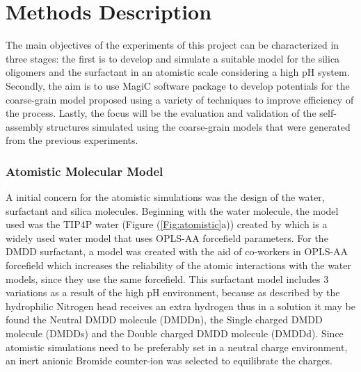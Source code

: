 \documentclass[10pt,a4paper,twoside]{article}
\begin{document}
\section{Methods Description} 

The main objectives of the experiments of this project can be characterized in three stages: the first is to develop and simulate a suitable model for the silica oligomers and the surfactant in an atomistic scale considering a high pH system. Secondly, the aim is to use MagiC software package to develop potentials for the coarse-grain model proposed using a variety of techniques to improve efficiency of the process. Lastly, the focus will be the evaluation and validation of the self-assembly structures simulated using the coarse-grain models that were generated from the previous experiments.

\subsubsection{Atomistic Molecular Model}

 A initial concern for the atomistic simulations was the design of the water, surfactant and silica molecules. Beginning with the water molecule, the model used was the TIP4P water (Figure (\ref{Fig:atomistic}a)) created by \cite{tip4p} which is a widely used water model that uses OPLS-AA forcefield \cite{opls} parameters. For the DMDD surfactant, a model was created with the aid of co-workers in OPLS-AA forcefield which increases the reliability of the atomic interactions with the water models, since they use the same forcefield. This surfactant model includes 3 variations as a result of the high pH environment, because as described by \cite{hheads} the hydrophilic Nitrogen head receives an extra hydrogen thus in a solution it may be found the Neutral DMDD molecule (DMDDn), the Single charged DMDD molecule (DMDDs) and the Double charged DMDD molecule (DMDDd). Since atomistic simulations need to be preferably set in a neutral charge environment, an inert anionic Bromide counter-ion was selected to equilibrate the charges.
 
\end{document}
